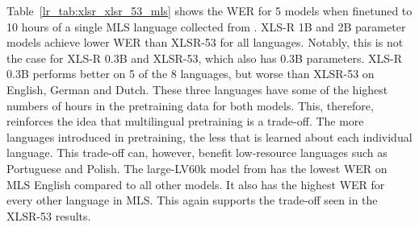 Table~\ref{lr_tab:xlsr_xlsr_53_mls} shows the WER for 5 models when finetuned to 10 hours of a single MLS language collected from \cite{XLSR-53, babu2021xlsr, MLS}. XLS-R 1B and 2B parameter models achieve lower WER than XLSR-53 for all languages. Notably, this is not the case for XLS-R 0.3B and XLSR-53, which also has 0.3B parameters. XLS-R 0.3B performs better on 5 of the 8 languages, but worse than XLSR-53 on English, German and Dutch. These three languages have some of the highest numbers of hours in the pretraining data for both models. This, therefore, reinforces the idea that multilingual pretraining is a trade-off. The more languages introduced in pretraining, the less that is learned about each individual language. This trade-off can, however, benefit low-resource languages such as Portuguese and Polish. The large-LV60k model from \cite{wav2vec} has the lowest WER on MLS English compared to all other models. It also has the highest WER for every other language in MLS. This again supports the trade-off seen in the XLSR-53 results.


